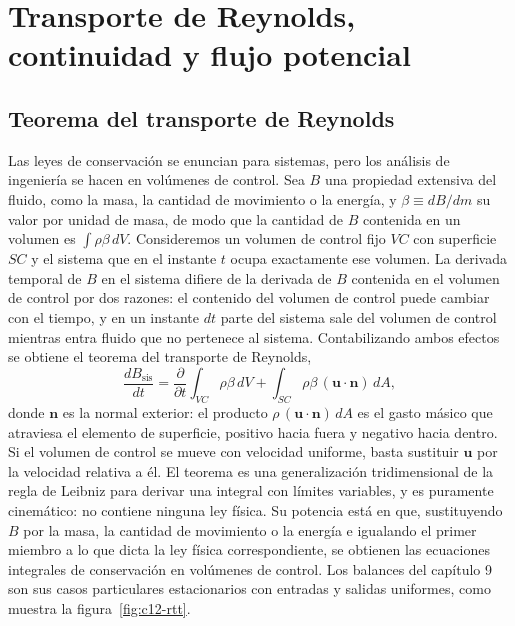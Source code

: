 \documentclass[10pt,openany]{book}
\begin{document}
\chapter{Transporte de Reynolds, continuidad y flujo potencial}
\label{chap:c12}


\section{Teorema del transporte de Reynolds}

Las leyes de conservación se enuncian para sistemas, pero los análisis de ingeniería se hacen en volúmenes de control. Sea \(B\) una propiedad extensiva del fluido, como la masa, la cantidad de movimiento o la energía, y \(\beta \equiv dB/dm\) su valor por unidad de masa, de modo que la cantidad de \(B\) contenida en un volumen es \(\int \rho\beta\,dV\). Consideremos un volumen de control fijo \(VC\) con superficie \(SC\) y el sistema que en el instante \(t\) ocupa exactamente ese volumen. La derivada temporal de \(B\) en el sistema difiere de la derivada de \(B\) contenida en el volumen de control por dos razones: el contenido del volumen de control puede cambiar con el tiempo, y en un instante \(dt\) parte del sistema sale del volumen de control mientras entra fluido que no pertenece al sistema. Contabilizando ambos efectos se obtiene el teorema del transporte de Reynolds,
\begin{equation}
\frac{dB_{\mathrm{sis}}}{dt} = \frac{\partial}{\partial t}\int_{VC}\rho\beta\,dV + \int_{SC}\rho\beta\,(\mathbf{u}\cdot\mathbf{n})\,dA, \label{eq:c12-rtt}
\end{equation}
donde \(\mathbf{n}\) es la normal exterior: el producto \(\rho\,(\mathbf{u}\cdot\mathbf{n})\,dA\) es el gasto másico que atraviesa el elemento de superficie, positivo hacia fuera y negativo hacia dentro. Si el volumen de control se mueve con velocidad uniforme, basta sustituir \(\mathbf{u}\) por la velocidad relativa a él. El teorema es una generalización tridimensional de la regla de Leibniz para derivar una integral con límites variables, y es puramente cinemático: no contiene ninguna ley física. Su potencia está en que, sustituyendo \(B\) por la masa, la cantidad de movimiento o la energía e igualando el primer miembro a lo que dicta la ley física correspondiente, se obtienen las ecuaciones integrales de conservación en volúmenes de control. Los balances del capítulo 9 son sus casos particulares estacionarios con entradas y salidas uniformes, como muestra la figura~\ref{fig:c12-rtt}.
\end{document}

